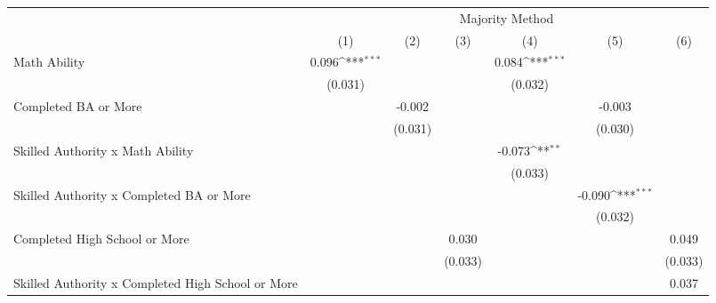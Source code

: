 \documentclass[]{article}
\begin{document}
\begin{table}
\begin{adjustbox}{width=\columnwidth,center}

{
\def\sym#1{\ifmmode^{#1}\else\(^{#1}\)\fi}
\begin{tabular}{l*{6}{c}}
\hline\hline
                &\multicolumn{6}{c}{Majority Method}                                                                              \\\cmidrule(lr){2-7}
                &\multicolumn{1}{c}{(1)}         &\multicolumn{1}{c}{(2)}         &\multicolumn{1}{c}{(3)}         &\multicolumn{1}{c}{(4)}         &\multicolumn{1}{c}{(5)}         &\multicolumn{1}{c}{(6)}         \\
\hline
Math Ability    &    0.096\sym{***}&                  &                  &    0.084\sym{***}&                  &                  \\
                &  (0.031)         &                  &                  &  (0.032)         &                  &                  \\
[1em]
Completed BA or More&                  &   -0.002         &                  &                  &   -0.003         &                  \\
                &                  &  (0.031)         &                  &                  &  (0.030)         &                  \\
[1em]
Skilled Authority x Math Ability&                  &                  &                  &   -0.073\sym{**} &                  &                  \\
                &                  &                  &                  &  (0.033)         &                  &                  \\
[1em]
Skilled Authority x Completed BA or More&                  &                  &                  &                  &   -0.090\sym{***}&                  \\
                &                  &                  &                  &                  &  (0.032)         &                  \\
[1em]
Completed High School or More&                  &                  &    0.030         &                  &                  &    0.049         \\
                &                  &                  &  (0.033)         &                  &                  &  (0.033)         \\
[1em]
Skilled Authority x Completed High School or More&                  &                  &                  &                  &                  &    0.037         \\

\end{tabular}}
\end{adjustbox}
\end{table}
\end{document}
